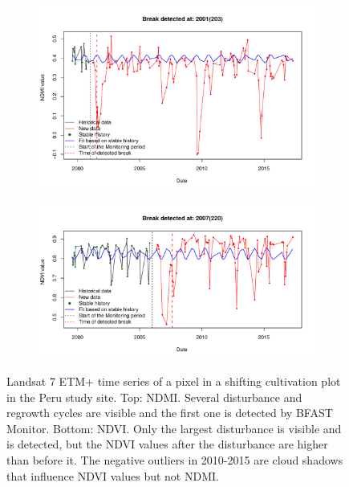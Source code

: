 \documentclass[a4paper,12pt]{scrbook}
\begin{document}
\begin{figure}
  \begin{subfigure}{\textwidth}
    \centering
    \includegraphics[width=\textwidth]{thesis-figures/13-peru-shifting-b}
  \end{subfigure}
  \begin{subfigure}{\textwidth}
    \centering
    \includegraphics[width=\textwidth]{thesis-figures/14-peru-shifting-ndvi-b}
  \end{subfigure}
  \caption{Landsat 7 \ac{ETM+} time series of a pixel in a shifting cultivation plot in the Peru study site. Top: \ac{NDMI}. Several disturbance and regrowth cycles are visible and the first one is detected by \ac{BFAST} Monitor. Bottom: \ac{NDVI}. Only the largest disturbance is visible and is detected, but the \ac{NDVI} values after the disturbance are higher than before it. The negative outliers in 2010-2015 are cloud shadows that influence \ac{NDVI} values but not \ac{NDMI}.}
  \label{fig-peru-shifting-cultivation}
\end{figure}
\end{document}
